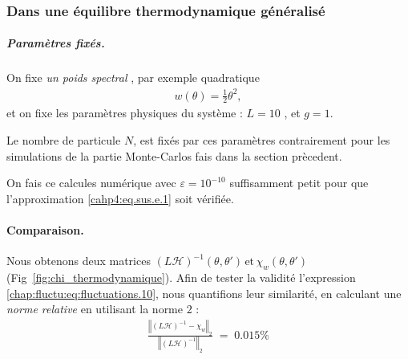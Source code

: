 %



\subsubsection{Dans une équilibre thermodynamique généralisé}

\subparagraph{Paramètres fixés.}
On fixe {\em un poids spectral} , par exemple quadratique
\begin{eqnarray}
	w(\theta) = \tfrac{1}{2} \theta^2,
\end{eqnarray}
et on fixe les paramètres physiques du système : \( L = 10 \) , et \( g = 1 \).


\meaning

Le nombre de particule $N$, est fixés par ces paramètres contrairement pour les simulations de la partie Monte-Carlos fais dans la section prècedent.

\meaning

On fais ce calcules numérique avec $\varepsilon = 10^{-10}$ suffisamment petit pour que l'approximation \eqref{cahp4:eq.sus.e.1} soit vérifiée.

\medskip




\paragraph{Comparaison.}
Nous obtenons deux matrices 
\(
\left( L \mathcal{H} \right)^{-1} (\theta, \theta') \,\text{et} \, \chi_w(\theta, \theta')
\)
(Fig~\eqref{fig:chi_thermodynamique}).
Afin de tester la validité l’expression \eqref{chap:fluctu:eq:fluctuations.10}, nous quantifions leur similarité, en calculant une {\em norme relative} en utilisant la norme \(2\) : 
\begin{eqnarray*}
    \frac{\left\Vert  (L\mathcal{H})^{-1}- \chi_w \right\Vert_2}{\left\Vert (L\mathcal{H})^{-1} \right\Vert_2} \;=\; 0.015 \%
\end{eqnarray*}



